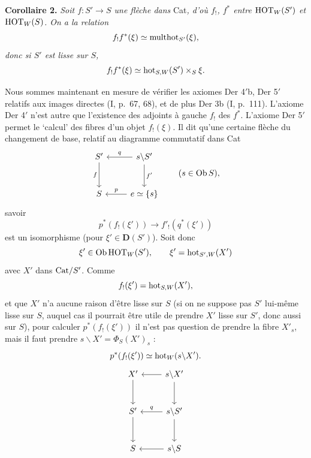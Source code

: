 \textbf{Corollaire 2.} \textit{Soit $f : S'\longrightarrow S$ une flèche dans} Cat\textit{, d'où $f_!$, $f^*$ entre} $\mathrm{HOT}_W(S')$ \textit{et} $\mathrm{HOT}_W(S)$\textit{. On a la relation}
\[f_!f^*(\xi)\simeq\mathrm{multhot}_{S'}(\xi),\]
\textit{donc si $S'$ est lisse sur $S$,}
\[f_!f^*(\xi)\simeq\mathrm{hot}_{S,W}(S')\times_S\xi.\]

Nous sommes maintenant en mesure de vérifier les axiomes Der 4$'$b, Der 5$'$ relatifs aux images directes (I, p.~67, 68), et de plus Der 3b (I, p.~111). L'axiome Der 4$'$ n'est autre que l'existence des adjoints à gauche $f_!$ des $f^*$. L'axiome Der 5$'$ permet le ‘calcul’ des fibres d'un objet $f_!(\xi)$. Il dit qu'une certaine
flèche du changement de base, relatif au diagramme commutatif dans Cat
\[\begin{tikzcd}[row sep=large]
S' \arrow[d,"f"'] & s\backslash S' \arrow[l,"q"'] \arrow[d,"f'"] \\
S & e\simeq\{s\} \arrow[l,"p"']
\end{tikzcd}\qquad(s\in\mathrm{Ob}\,S),\]
savoir
\[p^*(f_!(\xi'))\longrightarrow f'_!(q^*(\xi'))\]
est un isomorphisme (pour $\xi'\in\mathbf{D}(S')$). Soit donc
\[\xi'\in\mathrm{Ob}\,\mathrm{HOT}_W(S'),\qquad\xi'=\mathrm{hot}_{S',W}(X')\]
avec $X'$ dans $\mathrm{Cat}/S'$. Comme
\[f_!(\xi')=\mathrm{hot}_{S,W}(X'),\]
et que $X'$ n'a aucune raison d'être lisse sur $S$ (si on ne suppose pas $S'$ lui-même lisse sur $S$, auquel cas il pourrait être utile de prendre $X'$ lisse sur $S'$, donc aussi sur $S$), pour calculer $p^*(f_!(\xi'))$ il n'est pas question de prendre la fibre $X'_s$, mais il faut prendre $s\backslash X'=\Phi_S(X')_s$ :
\[p^*(f_!(\xi'))\simeq\mathrm{hot}_W(s\backslash X').\]
\[\begin{tikzcd}[row sep=large]
X' \arrow[d] & s\backslash X' \arrow[l] \arrow[d] \\
S' \arrow[d] & s\backslash S' \arrow[l,"q"'] \arrow[d] \\
S & s\backslash S \arrow[l]
\end{tikzcd}\]

